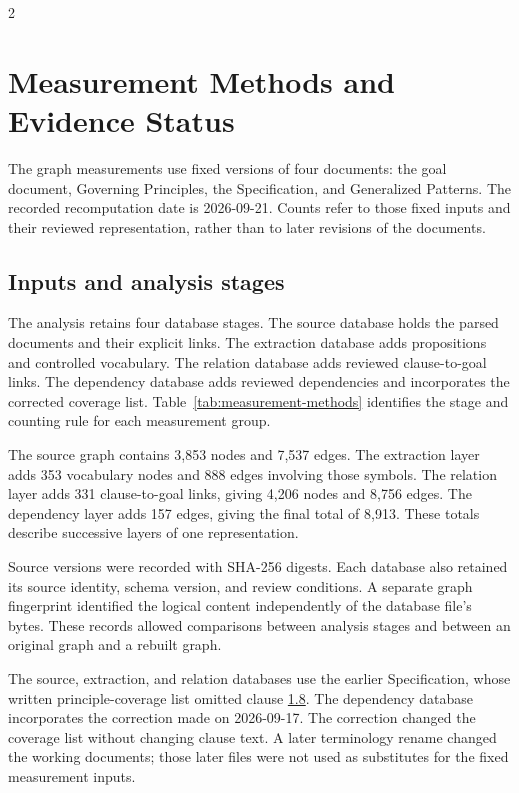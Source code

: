 \begin{multicols}{2}
\section{Measurement Methods and Evidence Status}
\label{app:repro}
\setcounter{table}{0}
\setcounter{figure}{0}

The graph measurements use fixed versions of four documents: the goal document, Governing Principles, the Specification, and Generalized Patterns. The recorded recomputation date is 2026-09-21. Counts refer to those fixed inputs and their reviewed representation, rather than to later revisions of the documents.

\subsection{Inputs and analysis stages}

The analysis retains four database stages. The source database holds the parsed documents and their explicit links. The extraction database adds propositions and controlled vocabulary. The relation database adds reviewed clause-to-goal links. The dependency database adds reviewed dependencies and incorporates the corrected coverage list. Table~\ref{tab:measurement-methods} identifies the stage and counting rule for each measurement group.

The source graph contains 3,853 nodes and 7,537 edges. The extraction layer adds 353 vocabulary nodes and 888 edges involving those symbols. The relation layer adds 331 clause-to-goal links, giving 4,206 nodes and 8,756 edges. The dependency layer adds 157 edges, giving the final total of 8,913. These totals describe successive layers of one representation.

Source versions were recorded with SHA-256 digests. Each database also retained its source identity, schema version, and review conditions. A separate graph fingerprint identified the logical content independently of the database file's bytes. These records allowed comparisons between analysis stages and between an original graph and a rebuilt graph.

The source, extraction, and relation databases use the earlier Specification, whose written principle-coverage list omitted clause \hyperlink{nss-1.8}{1.8}. The dependency database incorporates the correction made on 2026-09-17. The correction changed the coverage list without changing clause text. A later terminology rename changed the working documents; those later files were not used as substitutes for the fixed measurement inputs.
\end{multicols}

